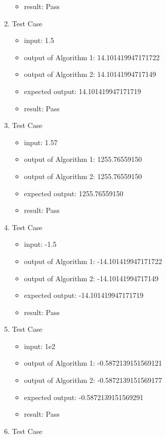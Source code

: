 \documentclass{article}
\begin{document}
\begin{enumerate}
\begin{itemize}
        \item result: Pass
    \end{itemize}
    \item Test Case 
    \begin{itemize}
        \item input: 1.5
        \item output of Algorithm 1: 14.101419947171722
        \item output of Algorithm 2: 14.10141994717149
        \item expected output: 14.101419947171719
        \item result: Pass
    \end{itemize}
    \item Test Case 
    \begin{itemize}
        \item input: 1.57
        \item output of Algorithm 1: 1255.76559150
        \item output of Algorithm 2: 1255.76559150
        \item expected output: 1255.76559150
        \item result: Pass
    \end{itemize}
    \item Test Case 
    \begin{itemize}
        \item input: -1.5
        \item output of Algorithm 1: -14.101419947171722
        \item output of Algorithm 2: -14.10141994717149
        \item expected output: -14.101419947171719
        \item result: Pass
    \end{itemize}
    \item Test Case 
    \begin{itemize}
        \item input: 1e2
        \item output of Algorithm 1: -0.5872139151569121
        \item output of Algorithm 2: -0.5872139151569177
        \item expected output: -0.5872139151569291
        \item result: Pass
    \end{itemize}
    \item Test Case 

\end{enumerate}
\end{document}
